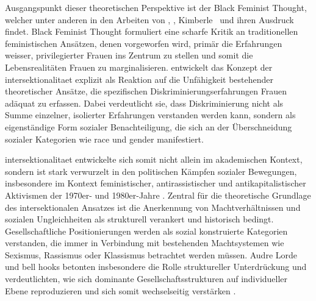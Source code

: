 
Ausgangspunkt dieser theoretischen Perspektive ist der Black Feminist Thought, welcher unter anderen in den Arbeiten von \textcite{hooksAintWomanBlack1981}, \textcite{lordeSisterOutsiderEssays1984}, Kimberle~\textcite{crenshawMappingMarginsIntersectionality1991} und \textcite{collinsBlackFeministThought2002} ihren Ausdruck findet. Black Feminist Thought formuliert eine scharfe Kritik an traditionellen feministischen Ansätzen, denen vorgeworfen wird, primär die Erfahrungen weisser, privilegierter Frauen ins Zentrum zu stellen und somit die Lebensrealitäten \emph{} Frauen zu marginalisieren. \textcite{crenshawMappingMarginsIntersectionality1991} entwickelt das Konzept der \gls{intersektionalitaet} explizit als Reaktion auf die Unfähigkeit bestehender theoretischer Ansätze, die spezifischen Diskriminierungserfahrungen \emph{} Frauen adäquat zu erfassen. Dabei verdeutlicht sie, dass Diskriminierung nicht als Summe einzelner, isolierter Erfahrungen verstanden werden kann, sondern als eigenständige Form sozialer Benachteiligung, die sich an der Überschneidung sozialer Kategorien wie \gls{race} und \gls{gender} manifestiert.

\gls{intersektionalitaet} entwickelte sich somit nicht allein im akademischen Kontext, sondern ist stark verwurzelt in den politischen Kämpfen sozialer Bewegungen, insbesondere im Kontext feministischer, antirassistischer und antikapitalistischer Aktivismen der 1970er- und 1980er-Jahre \parencite{collinsBlackFeministThought2002}. Zentral für die theoretische Grundlage des intersektionalen Ansatzes ist die Anerkennung von Machtverhältnissen und sozialen Ungleichheiten als strukturell verankert und historisch bedingt. Gesellschaftliche Positionierungen werden als sozial konstruierte Kategorien verstanden, die immer in Verbindung mit bestehenden Machtsystemen wie Sexismus, Rassismus oder Klassismus betrachtet werden müssen. Audre Lorde und bell hooks betonten insbesondere die Rolle struktureller Unterdrückung und verdeutlichten, wie sich dominante Gesellschaftsstrukturen auf individueller Ebene reproduzieren und sich somit wechselseitig verstärken \parencite{collinsBlackFeministThought2002, hancockWhenMultiplicationDoesnt2007}.

